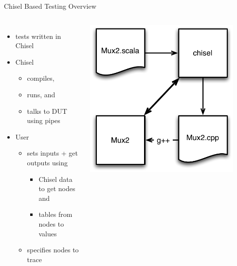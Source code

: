 \documentclass[xcolor=pdflatex,dvipsnames,table]{beamer}
\begin{document}
\begin{frame}{Chisel Based Testing Overview}
\begin{columns}
\begin{itemize}
\item tests written in Chisel
\item Chisel
\begin{itemize}
\item compiles, 
\item runs, and 
\item talks to DUT using pipes
\end{itemize}
\item User
\begin{itemize}
\item sets inputs + get outputs using
\begin{itemize}
\item Chisel data to get nodes and
\item tables from nodes to values
\end{itemize}
\item specifies nodes to trace
\end{itemize}
\end{itemize}

\begin{center}
\includegraphics[width=0.9\textwidth]{figs/chisel-testing.pdf}
\end{center}
\end{columns}
\end{frame}
\end{document}
